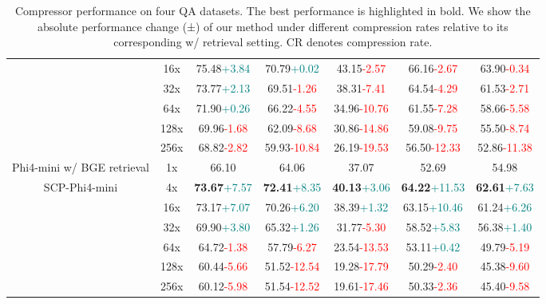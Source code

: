 \documentclass{applemlr}
\numberwithin{equation}{section}
\begin{document}
\begin{table}[!t]
\begin{tabular}{ccccccc}
 & 16x & 75.48\tiny\textcolor{teal}{+3.84} & 70.79\tiny\textcolor{teal}{+0.02} & 43.15\tiny\textcolor{red}{-2.57} & 66.16\tiny\textcolor{red}{-2.67} & 63.90\tiny\textcolor{red}{-0.34} \\
 & 32x & 73.77\tiny\textcolor{teal}{+2.13} & 69.51\tiny\textcolor{red}{-1.26} & 38.31\tiny\textcolor{red}{-7.41} & 64.54\tiny\textcolor{red}{-4.29} & 61.53\tiny\textcolor{red}{-2.71} \\
 & 64x & 71.90\tiny\textcolor{teal}{+0.26} & 66.22\tiny\textcolor{red}{-4.55} & 34.96\tiny\textcolor{red}{-10.76} & 61.55\tiny\textcolor{red}{-7.28} & 58.66\tiny\textcolor{red}{-5.58} \\
 & 128x & 69.96\tiny\textcolor{red}{-1.68} & 62.09\tiny\textcolor{red}{-8.68} & 30.86\tiny\textcolor{red}{-14.86} & 59.08\tiny\textcolor{red}{-9.75} & 55.50\tiny\textcolor{red}{-8.74} \\
 & 256x & 68.82\tiny\textcolor{red}{-2.82} & 59.93\tiny\textcolor{red}{-10.84} & 26.19\tiny\textcolor{red}{-19.53} & 56.50\tiny\textcolor{red}{-12.33} & 52.86\tiny\textcolor{red}{-11.38} \\
\cline{2-7}
Phi4-mini w/ BGE retrieval & 1x & 66.10 & 64.06 & 37.07 & 52.69 & 54.98 \\
\multirow{6}{*}{SCP-Phi4-mini }  & 4x & \textbf{73.67}\tiny\textcolor{teal}{+7.57} & \textbf{72.41}\tiny\textcolor{teal}{+8.35} & \textbf{40.13}\tiny\textcolor{teal}{+3.06} & \textbf{64.22}\tiny\textcolor{teal}{+11.53} & \textbf{62.61}\tiny\textcolor{teal}{+7.63} \\
 & 16x & 73.17\tiny\textcolor{teal}{+7.07} & 70.26\tiny\textcolor{teal}{+6.20} & 38.39\tiny\textcolor{teal}{+1.32} & 63.15\tiny\textcolor{teal}{+10.46} & 61.24\tiny\textcolor{teal}{+6.26} \\
 & 32x & 69.90\tiny\textcolor{teal}{+3.80} & 65.32\tiny\textcolor{teal}{+1.26} & 31.77\tiny\textcolor{red}{-5.30} & 58.52\tiny\textcolor{teal}{+5.83} & 56.38\tiny\textcolor{teal}{+1.40} \\
 & 64x & 64.72\tiny\textcolor{red}{-1.38} & 57.79\tiny\textcolor{red}{-6.27} & 23.54\tiny\textcolor{red}{-13.53} & 53.11\tiny\textcolor{teal}{+0.42} & 49.79\tiny\textcolor{red}{-5.19} \\
 & 128x & 60.44\tiny\textcolor{red}{-5.66} & 51.52\tiny\textcolor{red}{-12.54} & 19.28\tiny\textcolor{red}{-17.79} & 50.29\tiny\textcolor{red}{-2.40} & 45.38\tiny\textcolor{red}{-9.60} \\
 & 256x & 60.12\tiny\textcolor{red}{-5.98} & 51.54\tiny\textcolor{red}{-12.52} & 19.61\tiny\textcolor{red}{-17.46} & 50.33\tiny\textcolor{red}{-2.36} & 45.40\tiny\textcolor{red}{-9.58} \\
\toprule
\end{tabular}
\caption{Compressor performance on four QA datasets. The best performance is highlighted in bold. We show the absolute performance change (±) of our method under different compression rates relative to its corresponding w/ retrieval setting. CR denotes compression rate.
 }
\label{result:compression1}
\end{table}
\end{document}
